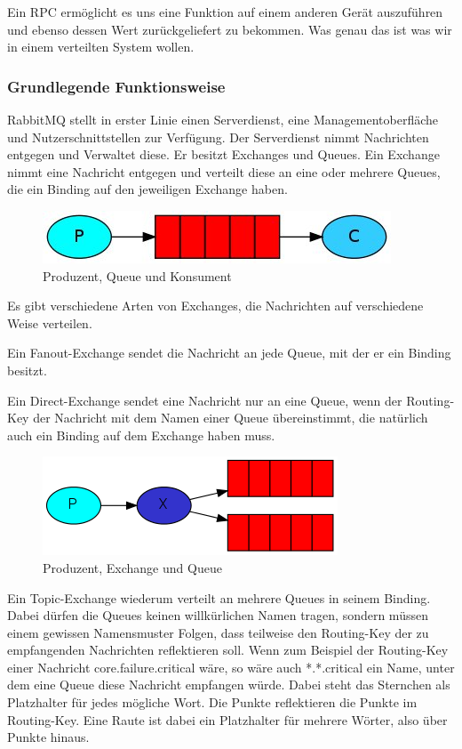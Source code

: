 \documentclass[12pt,a4paper]{scrartcl}
\begin{document}
Ein RPC ermöglicht es uns eine Funktion auf einem anderen Gerät auszuführen und ebenso dessen Wert zurückgeliefert zu bekommen. Was genau das ist was wir in einem verteilten System wollen.

\subsubsection{Grundlegende Funktionsweise}

RabbitMQ stellt in erster Linie einen Serverdienst, eine Managementoberfläche und Nutzerschnittstellen zur Verfügung. Der Serverdienst nimmt Nachrichten entgegen und Verwaltet diese. 
Er besitzt Exchanges und Queues. Ein Exchange nimmt eine Nachricht entgegen und verteilt diese an eine oder mehrere Queues, die ein Binding auf den jeweiligen Exchange haben. 

\begin{figure}[h!]
	\centering
	\includegraphics[scale=1]{P2C.jpg}
	\caption[https://www.rabbitmq.com/tutorials/tutorial-one-dotnet.html]{Produzent, Queue und Konsument}
\end{figure}

Es gibt verschiedene Arten von Exchanges, die Nachrichten auf verschiedene Weise verteilen. 

Ein Fanout-Exchange sendet die Nachricht an jede Queue, mit der er ein Binding besitzt. 

Ein Direct-Exchange sendet eine Nachricht nur an eine Queue, wenn der Routing-Key der Nachricht mit dem Namen einer Queue übereinstimmt, die natürlich auch ein Binding auf dem Exchange haben muss.

\begin{figure}[h!]
	\centering
	\includegraphics[scale=1.65]{exchanges.png}
	\caption[https://www.rabbitmq.com/tutorials/tutorial-three-dotnet.html]{Produzent, Exchange und Queue}
\end{figure}

Ein Topic-Exchange wiederum verteilt an mehrere Queues in seinem Binding. Dabei dürfen die Queues keinen willkürlichen Namen tragen, sondern müssen einem gewissen Namensmuster Folgen, dass teilweise den Routing-Key der zu empfangenden Nachrichten reflektieren soll. Wenn zum Beispiel der Routing-Key einer Nachricht core.failure.critical wäre, so wäre auch *.*.critical ein Name, unter dem eine Queue diese Nachricht empfangen würde. Dabei steht das Sternchen als Platzhalter für jedes mögliche Wort. Die Punkte reflektieren die Punkte im Routing-Key. Eine Raute ist dabei ein Platzhalter für mehrere Wörter, also über Punkte hinaus. 
\end{document}
